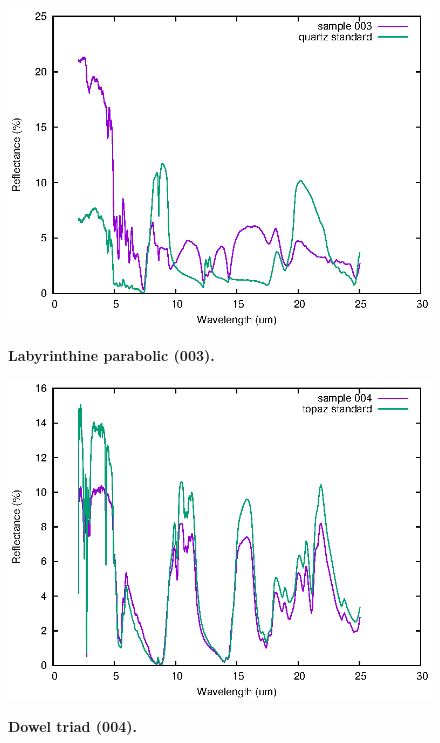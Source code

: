 \documentclass[10pt,twoside,openany]{article}
\theoremstyle{definition}
\begin{document}
\begin{figure}
  {\includegraphics[angle=0,width=1.0\textwidth]{003.eps}}%
  {\caption{\label{fig:003}\textbf{Labyrinthine parabolic (003).}}}
  \end{figure}
  \begin{figure}
  {\includegraphics[angle=0,width=1.0\textwidth]{004.eps}}%
  {\caption{\label{fig:004}\textbf{Dowel triad (004).}}}
\end{figure}
\end{document}
